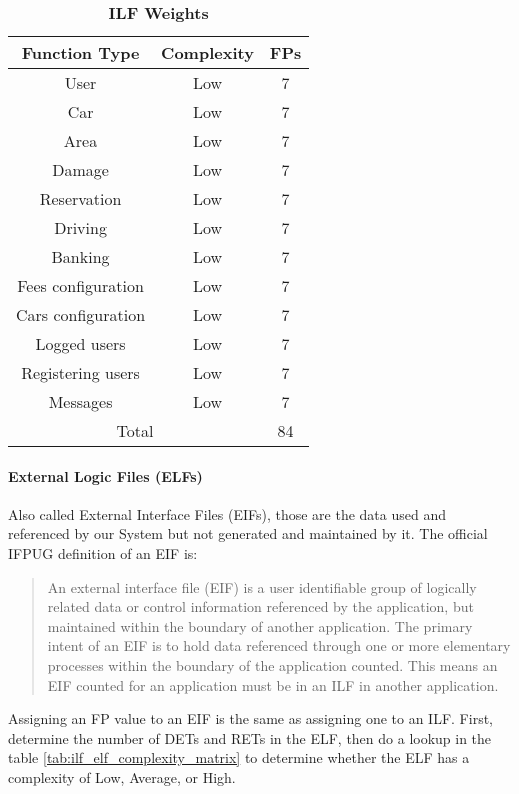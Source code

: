 \begin{longtable}{| c | c | c |}
	\caption{\textbf{ILF Weights}} %
	\label{tab:ilf_weights}%
	\\ \hline %
	
	\textbf{Function Type} & \textbf{Complexity} & \textbf{FPs}\\ \hline
	User & Low & 7\\ \hline
	Car & Low & 7\\ \hline
	Area & Low & 7\\ \hline
	Damage & Low & 7\\ \hline
	Reservation & Low & 7\\ \hline
	Driving & Low & 7\\ \hline
	Banking & Low & 7\\ \hline
	Fees configuration & Low & 7\\ \hline
	Cars configuration & Low & 7\\ \hline
	Logged users & Low & 7\\ \hline
	Registering users & Low & 7 \\ \hline
	Messages & Low & 7 \\ \hline
	\multicolumn{2}{|c|}{Total} & 84 \\ \hline
	
\end{longtable}

\paragraph{External Logic Files (ELFs)}
Also called External Interface Files (EIFs), those are the data used and referenced by our System but not generated and maintained by it.
The official IFPUG definition of an EIF is:

\begin{quote}
An external interface file (EIF) is a user identifiable group of logically related data or control information referenced by the application, but maintained within the boundary of another application. The primary intent of an EIF is to hold data referenced through one or more elementary processes within the boundary of the application counted. This means an EIF counted for an application must be in an ILF in another application.
\end{quote}

Assigning an FP value to an EIF is the same as assigning one to an ILF. First, determine the number of DETs and RETs in the ELF, then do a lookup in the table \ref{tab:ilf_elf_complexity_matrix} to determine whether the ELF has a complexity of Low, Average, or High.  
\bigskip

